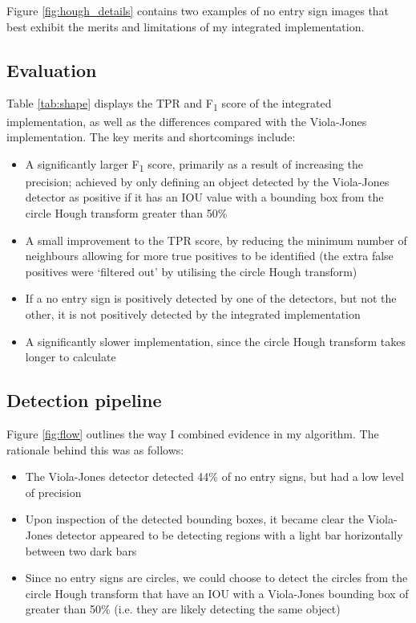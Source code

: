 \documentclass[twocolumn, 10pt, a4paper]{article}
\begin{document}
Figure \ref{fig:hough_details} contains two examples of no entry sign images that best exhibit the merits and limitations of my integrated implementation.

\subsection{Evaluation}

Table \ref{tab:shape} displays the TPR and F\textsubscript{1} score of the integrated implementation, as well as the differences compared with the Viola-Jones implementation.
The key merits and shortcomings include:
\begin{itemize}
\itemsep 0em 
\item A significantly larger F\textsubscript{1} score, primarily as a result of increasing the precision; achieved by only defining an object detected by the Viola-Jones detector as positive if it has an IOU value with a  bounding box from the circle Hough transform greater than 50\%
\item A small improvement to the TPR score, by reducing the minimum  number of neighbours allowing for more true positives to be identified (the extra false positives were `filtered out' by utilising the circle Hough transform)
\item If a no entry sign is positively detected by one of the detectors, but not the other, it is not positively detected by the integrated implementation
\item A significantly slower implementation, since the circle Hough transform takes longer to calculate
\end{itemize}

\subsection{Detection pipeline}

Figure \ref{fig:flow} outlines the way I combined evidence in my algorithm.
The rationale behind this was as follows:
\begin{itemize}
\itemsep 0em 
\item The Viola-Jones detector detected 44\% of no entry signs, but had a low level of precision
\item Upon inspection of the detected bounding boxes, it became clear the Viola-Jones detector appeared to be detecting regions with a light bar horizontally between two dark bars
\item Since no entry signs are circles, we could choose to detect the circles from the circle Hough transform that have an IOU with a Viola-Jones bounding box of greater than 50\% (i.e. they are likely detecting the same object)
\end{itemize}
\end{document}
